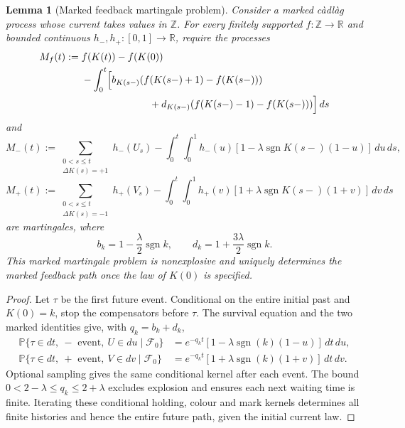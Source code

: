 \documentclass[11pt,reqno]{amsart}
\newtheorem{lemma}[theorem]{Lemma}
\theoremstyle{definition}
\theoremstyle{remark}
\numberwithin{equation}{section}
\newcommand{\Pp}{\mathbb P}
\newcommand{\sgn}{\operatorname{sgn}}
\begin{document}
\begin{lemma}[Marked feedback martingale problem]
\label{lem:marked-mp}
Consider a marked càdlàg process whose current takes values in
\(\mathbb Z\).  For every finitely supported \(f:\mathbb Z\to\mathbb R\)
and bounded continuous \(h_-,h_+:[0,1]\to\mathbb R\), require the processes
\begin{equation}
\begin{aligned}
M_f(t):={}&f(K(t))-f(K(0))\\
&-\int_0^t\Bigl[
b_{K(s-)}(f(K(s-)+1)-f(K(s-)))\\
&\hspace{24mm}
+d_{K(s-)}(f(K(s-)-1)-f(K(s-)))
\Bigr]\,ds
\end{aligned}
\label{eq:3.MP1}
\end{equation}
and
\begin{equation}
M_-(t)
:=
\sum_{\substack{0<s\le t\\ \Delta K(s)=+1}}h_-(U_s)
-
\int_0^t\int_0^1
h_-(u)[1-\lambda\sgn K(s-)(1-u)]\,du\,ds,
\label{eq:3.MP2}
\end{equation}
\begin{equation}
M_+(t)
:=
\sum_{\substack{0<s\le t\\ \Delta K(s)=-1}}h_+(V_s)
-
\int_0^t\int_0^1
h_+(v)[1+\lambda\sgn K(s-)(1+v)]\,dv\,ds
\label{eq:3.MP3}
\end{equation}
are martingales, where
\[
b_k=1-\frac{\lambda}{2}\sgn k,\qquad
d_k=1+\frac{3\lambda}{2}\sgn k.
\]
This marked martingale problem is nonexplosive and uniquely determines
the marked feedback path once the law of \(K(0)\) is specified.
\end{lemma}

\begin{proof}
Let \(\tau\) be the first future event.  Conditional on the entire
initial past and \(K(0)=k\), stop the compensators before \(\tau\).
The survival equation and the two marked identities give, with
\(q_k=b_k+d_k\),
\[
\begin{aligned}
\Pp\{\tau\in dt,\ {-}\text{ event},\ U\in du\mid\mathcal F_0\}
 &=e^{-q_kt}[1-\lambda\sgn(k)(1-u)]\,dt\,du,\\
\Pp\{\tau\in dt,\ {+}\text{ event},\ V\in dv\mid\mathcal F_0\}
 &=e^{-q_kt}[1+\lambda\sgn(k)(1+v)]\,dt\,dv.
\end{aligned}
\]
Optional sampling gives the same conditional kernel after each event.
The bound \(0<2-\lambda\le q_k\le2+\lambda\) excludes explosion and
ensures each next waiting time is finite.  Iterating these conditional
holding, colour and mark kernels determines all finite histories and
hence the entire future path, given the initial current law.
\end{proof}
\end{document}
